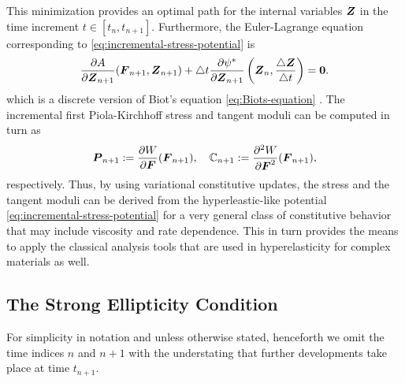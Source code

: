 \documentclass[12pt]{article}
\newcommand{\mbs}[1]{\boldsymbol{#1}}
\newcommand{\mbb}[1]{\mathbb{#1}}
\def\bP{{\mbs{P}}} \def\bQ{{\mbs{Q}}} \def\bR{{\mbs{R}}}
\numberwithin{equation}{section}
\begin{document}
This minimization provides an optimal path for the internal variables
$\bZ$ in the time increment $t \in [t_n, t_{n+1}]$. Furthermore, the
Euler-Lagrange equation corresponding to
\eqref{eq:incremental-stress-potential} is
\begin{equation} \label{eq:Biots-equation-discrete}
  \frac{\partial A}{\partial \bZ_{n+1}}(\bF_{n+1}, \bZ_{n+1})
  +
  \triangle t
  \frac{\partial \psi^*}{\partial \bZ_{n+1}}
  \left(\bZ_n, \frac{\triangle \bZ}{\triangle t}\right)
  =
  \mathbf{0}.
\end{equation}
which is a discrete version of Biot's equation
\eqref{eq:Biots-equation} \citep{Miehe:Schotte:Lambrecht:2002}. The
incremental first Piola-Kirchhoff stress and tangent moduli can be
computed in turn as
\begin{equation} \label{eq:incremental-stress-moduli}
  \bP_{n+1} := \frac{\partial W}{\partial \bF} (\bF_{n+1}),
  \quad
  \mbb{C}_{n+1} := \frac{\partial^2 W}{\partial \bF^2} (\bF_{n+1}),
\end{equation}
respectively. Thus, by using variational constitutive updates, the
stress and the tangent moduli can be derived from the
hyperleastic-like potential \eqref{eq:incremental-stress-potential}
for a very general class of constitutive behavior that may include
viscosity and rate dependence. This in turn provides the means to
apply the classical analysis tools that are used in hyperelasticity
for complex materials as well.

\subsection{The Strong Ellipticity Condition}

For simplicity in notation and unless otherwise stated, henceforth we
omit the time indices $n$ and $n+1$ with the understating that further
developments take place at time $t_{n+1}$.
\end{document}
